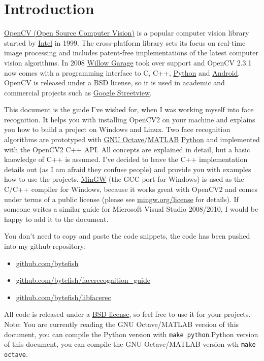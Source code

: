\section{Introduction}

\href{http://opencv.willowgarage.com}{OpenCV (Open Source Computer Vision)} is a popular computer vision library started by \href{http://www.intel.com}{Intel} in 1999. The cross-platform library sets its focus on real-time image processing and includes patent-free implementations of the latest computer vision algorithms. In 2008 \href{http://www.willowgarage.com}{Willow Garage} took over support and OpenCV 2.3.1 now comes with a programming interface to C, C++, \href{http://www.python.org}{Python} and \href{http://www.android.com}{Android}. OpenCV is released under a BSD license, so it is used in academic and commercial projects such as \href{http://www.google.com/streetview}{Google Streetview}.

This document is the guide I've wished for, when I was working myself into face recognition. It helps you with installing OpenCV2 on your machine and explains you how to build a project on Windows and Linux. Two face recognition algorithms are prototyped with \ifx\python\undefined \href{http://www.gnu.org/software/octave/}{GNU Octave}/\href{http://www.mathworks.com}{MATLAB} \else \href{http://www.python.org}{Python}\fi{} and implemented with the OpenCV2 C++ API. All concepts are explained in detail, but a basic knowledge of C++ is assumed. I've decided to leave the C++ implementation details out (as I am afraid they confuse people) and provide you with examples how to use the projects. \href{http://www.mingw.org}{MinGW} (the GCC port for Windows) is used as the C/C++ compiler for Windows, because it works great with OpenCV2 and comes under terms of a public license (please see \href{http://www.mingw.org/license}{mingw.org/license} for details). If someone writes a similar guide for Microsoft Visual Studio 2008/2010, I would be happy to add it to the document.

You don't need to copy and paste the code snippets, the code has been pushed into my github repository:

\begin{itemize}
  \item \href{http://www.github.com/bytefish}{github.com/bytefish}
  \item \href{http://www.github.com/bytefish/facerecognition_guide}{github.com/bytefish/facerecognition\_guide}
  \item \href{http://www.github.com/bytefish/opencv}{github.com/bytefish/libfacerec}
\end{itemize}

All code is released under a \href{http://www.opensource.org/licenses/bsd-license}{BSD license}, so feel free to use it for your projects. Note: You are currently reading the \ifx\python\undefined GNU Octave/MATLAB version of this document, you can compile the Python version with \lstinline|make python|.\else Python version of this document, you can compile the GNU Octave/MATLAB version wth \lstinline|make octave|.\fi
